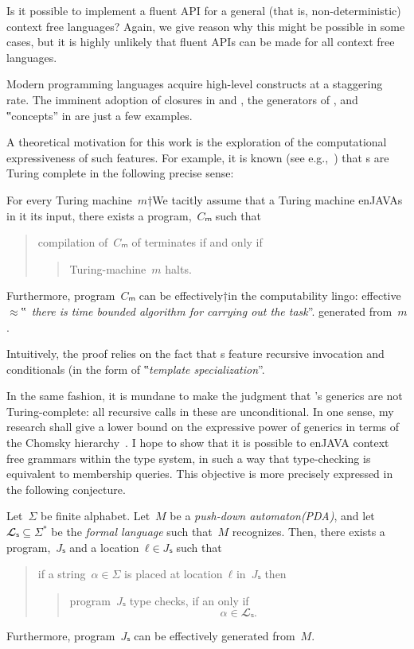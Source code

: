 Is it possible to implement a fluent API for a general 
  (that is, non-deterministic) context free languages? 
Again, we give reason why this might be possible in some cases,
  but it is highly unlikely that fluent APIs can be made for all context free languages.

Modern programming languages acquire high-level constructs
  at a staggering rate.
The imminent adoption of closures in \Java and \CC,
  the generators of \CSharp, and ‟concepts” in
  \CC are just a few examples.

A theoretical motivation for this work
  is the exploration of the computational
  expressiveness of such features.
For example, it is known (see e.g.,~\cite{Gutterman:2003}) that
  s are Turing complete in the following precise sense:

\begin{Theorem}
  \label{Theorem:Gutterman}
  For every Turing machine~$m$†{We tacitly assume that a Turing machine
    enJAVAs in it its input}, there exists a \CC program,~$Cₘ$ such that
  \begin{quote}
    compilation of~$Cₘ$ of terminates if and only if
    \begin{quote}
      Turing-machine~$m$ halts.
    \end{quote}
  \end{quote}
  Furthermore, program~$Cₘ$ can be effectively†{in the computability lingo:
    effective~$≈$‟~\emph{there is time
  bounded algorithm for carrying out the task}”.} generated from~$m$.
\end{Theorem}

Intuitively, the proof relies on the fact that s
  feature recursive invocation and conditionals (in the form of
  ‟\emph{template specialization}”.

In the same fashion, it is mundane to make the judgment that
  \Java's generics are not Turing-complete: all recursive calls
  in these are unconditional.
In one sense, my research shall give a lower bound on the
  expressive power of \Java generics in terms of the Chomsky hierarchy~\cite{Chomsky:1963}.
I hope to show that it is possible to enJAVA context free grammars within the \Java type system,
  in such a way that type-checking is equivalent to membership queries.
This objective is more precisely expressed in the following conjecture.

\begin{Theorem}
\label{Theorem:Gil-Levy}
Let~$Σ$ be finite alphabet.
Let~$M$ be a \emph{push-down automaton(PDA)}, and let~$𝓛ₛ⊆Σ^*$ be
the \emph{formal language} such that~$M$ recognizes.
Then, there exists a \Java program,~$Jₛ$ and a location~$ℓ∈Jₛ$
such that
\begin{quote}
  if a string~$α∈Σ$ is
  placed at location~$ℓ$ in~$Jₛ$ then
  \begin{quote}
    program~$Jₛ$ type checks, if an only if
    \[
      α∈𝓛ₛ.
    \]
  \end{quote}
\end{quote}
Furthermore, program~$Jₛ$ can be effectively generated from~$M$.
\end{Theorem}

